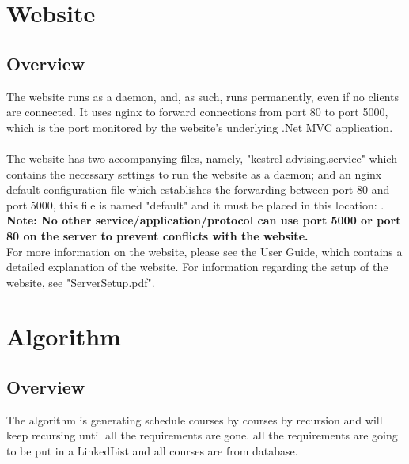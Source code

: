 \documentclass[letterpaper]{report}
\begin{document}
	\chapter{Website}
	\section{Overview}
	The website runs as a daemon, and, as such, runs permanently, even if no clients are connected. It uses nginx to forward connections from port 80 to port 5000, which is the port monitored by the website's underlying .Net MVC application.\\ \\ The website has two accompanying files, namely, "kestrel-advising.service" which contains the necessary settings to run the website as a daemon; and an nginx default configuration file which establishes the forwarding between port 80 and port 5000, this file is named "default" and it must be placed in this location: . \textbf{Note: No other service/application/protocol can use port 5000 or port 80 on the server to prevent conflicts with the website.}\\ For more information on the website, please see the User Guide, which contains a detailed explanation of the website. For information regarding the setup of the website, see "ServerSetup.pdf".
	\chapter{Algorithm}
	\section{Overview}
	The algorithm is generating schedule courses by courses by recursion and will keep recursing until all the requirements are gone. all the requirements are going to be put in a LinkedList and all courses are from database.\\
\end{document}
